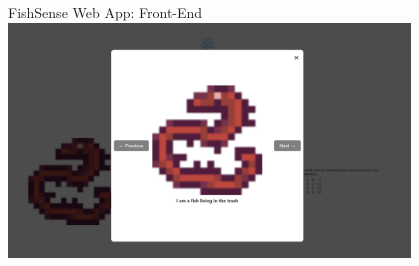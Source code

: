 \begin{frame}{FishSense Web App: Front-End}
    \centering
    \includegraphics[height=0.8\textheight,width=0.8\textwidth,keepaspectratio]{images/fishsense_enduser/webapp_clickintoimage.png}
\end{frame}

